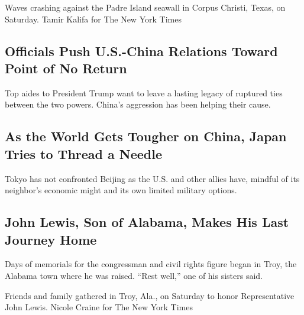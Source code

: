 Waves crashing against the Padre Island seawall in Corpus Christi,
Texas, on Saturday. Tamir Kalifa for The New York Times

\href{/2020/07/25/world/asia/us-china-trump-xi.html}{}

\hypertarget{officials-push-us-china-relations-toward-point-of-no-return}{%
\subsection{Officials Push U.S.-China Relations Toward Point of No
Return}\label{officials-push-us-china-relations-toward-point-of-no-return}}

Top aides to President Trump want to leave a lasting legacy of ruptured
ties between the two powers. China's aggression has been helping their
cause.

\href{/2020/07/25/world/asia/japan-china-xi.html}{}

\hypertarget{as-the-world-gets-tougher-on-china-japan-tries-to-thread-a-needle}{%
\subsection{As the World Gets Tougher on China, Japan Tries to Thread a
Needle}\label{as-the-world-gets-tougher-on-china-japan-tries-to-thread-a-needle}}

Tokyo has not confronted Beijing as the U.S. and other allies have,
mindful of its neighbor's economic might and its own limited military
options.

\href{/2020/07/25/us/john-lewis-memorial-service.html}{}

\hypertarget{john-lewis-son-of-alabama-makes-his-last-journey-home}{%
\subsection{John Lewis, Son of Alabama, Makes His Last Journey
Home}\label{john-lewis-son-of-alabama-makes-his-last-journey-home}}

Days of memorials for the congressman and civil rights figure began in
Troy, the Alabama town where he was raised. ``Rest well,'' one of his
sisters said.

\href{/2020/07/25/us/john-lewis-memorial-service.html}{}

Friends and family gathered in Troy, Ala., on Saturday to honor
Representative John Lewis. Nicole Craine for The New York Times

\href{/2020/07/25/us/politics/trump-florida-convention.html}{}

